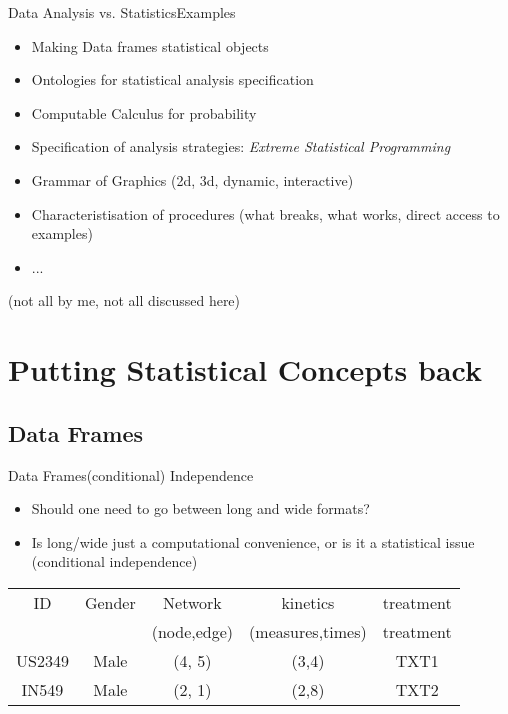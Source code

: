 \documentclass{beamer}
\begin{document}
\begin{frame}{Data Analysis vs. Statistics}{Examples}
  \begin{itemize}
  \item Making Data frames statistical objects
  \item Ontologies for statistical analysis specification
  \item Computable Calculus for probability
  \item Specification of analysis strategies: \textit{Extreme Statistical Programming}
  \item Grammar of Graphics (2d, 3d, dynamic, interactive)
  \item Characteristisation of procedures (what breaks, what works,
    direct access to examples)
  \item ...
  \end{itemize}
  (not all by me, not all discussed here)
\end{frame}

\section{Putting Statistical Concepts back}

\subsection{Data Frames}

\begin{frame}{Data Frames}{(conditional) Independence}

  \begin{itemize}
  \item Should one need to go between long and wide formats?
  \item Is long/wide just a computational convenience, or is it a
    statistical issue (conditional independence)
  \end{itemize}
  \begin{table}
    \centering
    \begin{tabular}{c|c|c|c|c}
      \hline
      ID & Gender & Network     &  kinetics & treatment \\ 
      &        & (node,edge) & (measures,times) & treatment \\ 
      \hline
      US2349 & Male & (4, 5) & (3,4) & TXT1 \\
      \hline
      IN549  & Male & (2, 1) & (2,8) & TXT2 \\
      \hline
      
    \end{tabular}
  \end{table}

\end{frame}
\end{document}
